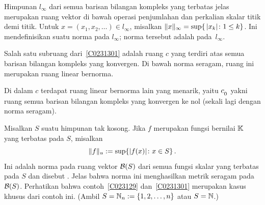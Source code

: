 \begin{exam}\label{C0231301} Himpunan $l_\infty$ dari semua barisan bilangan kompleks yang
terbatas jelas merupakan ruang vektor di bawah operasi penjumlahan dan perkalian skalar
titik demi titik. Untuk $x = (x_1,x_2,\dots) \in l_\infty$, misalkan
$\lVert x\rVert_\infty = \sup\{\,\lvert x_k\rvert \colon 1 \le k\}$. Ini mendefinisikan suatu norma pada
$l_\infty$; norma tersebut adalah
 pada~$l_\infty$.
\end{exam}

\begin{exam}\label{C0231302} Salah satu subruang dari~\ref{C0231301} adalah ruang $c$ yang
terdiri atas semua
barisan bilangan kompleks yang konvergen. Di bawah norma seragam, ruang ini merupakan
ruang linear bernorma.
\end{exam}

\begin{exam}\label{C0231303} Di dalam $c$ terdapat ruang linear bernorma lain yang menarik,
yaitu $c_{{}_{\scriptstyle{0}}}$
yakni ruang semua barisan bilangan kompleks yang konvergen ke nol (sekali lagi dengan
norma seragam).
\end{exam}

\begin{exam}\label{C023131} Misalkan $S$ suatu himpunan tak kosong. Jika $f$ merupakan fungsi
bernilai $\mathbb{K}$ yang terbatas pada $S$, misalkan
  \[ \lVert f\rVert_u := \sup\{\lvert f(x)\rvert \colon x \in S\}\,. \]
Ini adalah norma pada ruang vektor $\mathcal{B}(S)$ dari semua fungsi skalar yang
terbatas pada $S$ dan disebut
. Jelas bahwa norma ini menghasilkan metrik seragam pada~$\mathcal{B}(S)$.
Perhatikan bahwa contoh~\ref{C023129} dan~\ref{C0231301} merupakan kasus khusus dari
contoh ini. (Ambil $S = \mathbb{N}_n := \{1,2,\dots,n\}$ atau $S = \mathbb{N}$.)
\end{exam}











